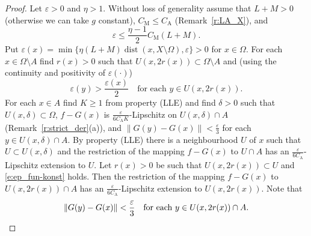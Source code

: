 \documentclass[a4paper,twoside,10pt,reqno,draft]{amsart}
\newenvironment{emshade}{%
  \snugshade
  \normalsize
}{%
  \endsnugshade
}
\theoremstyle{definition}
\theoremstyle{remark}
\newcommand\norm[1]{\mathopen\|#1\mathclose\|}
\newcommand\de{\delta}
\newcommand\ve{\varepsilon}
\newcommand\Om{\Omega}
\DeclareMathOperator{\dist}{dist}
\newcommand\pLLE{(LLE)}
\newcommand\cCA{C_{\mathrm A}}
\newcommand\cCM{C_{\mathrm M}}
\begin{document}
\begin{proof}\small
Let $\ve>0$ and
\begin{emshade}\noindent
$\eta>1$.
Without loss of generality assume that $L+M>0$ (otherwise we can take $g$ constant), $\cCM\le\cCA$ (Remark~\ref{r:LA_X}), and
\begin{equation}\label{e:ep_eta}
\ve\le\frac{\eta-1}2\cCM(L+M).
\end{equation}
Put $\ve(x)=\min\{\eta(L+M)\dist(x,X\setminus\Om),\ve\}>0$ for $x\in\Om$.
\end{emshade}\noindent
For each $x\in\Om\setminus A$ find $r(x)>0$ such that $U(x,2r(x))\subset\Om\setminus A$
\begin{emshade}\noindent
and (using the continuity and positivity of $\ve(\cdot)$)
\begin{equation}\label{e:ep_fun-konst}
\ve(y)>\frac{\ve(x)}2\quad\text{for each $y\in U(x,2r(x))$.}
\end{equation}
\end{emshade}\noindent
For each $x\in A$ find $K\ge1$ from property {\pLLE}
and find $\de>0$ such that $U(x,\de)\subset\Om$, $f-G(x)$ is $\frac\ve{6\cCA K}$-Lipschitz on $U(x,\de)\cap A$ (Remark~\ref{r:strict_der}(a)), and $\norm{G(y)-G(x)}<\frac\ve3$ for each $y\in U(x,\de)\cap A$.
By property {\pLLE} there is a neighbourhood $U$ of $x$ such that $U\subset U(x,\de)$ and the restriction of the mapping $f-G(x)$ to $U\cap A$ has an $\frac\ve{6\cCA}$-Lipschitz extension to $U$.
Let $r(x)>0$ be such that $U(x,2r(x))\subset U$
\begin{emshade}\noindent
and \eqref{e:ep_fun-konst} holds.
\end{emshade}\noindent
Then the restriction of the mapping $f-G(x)$ to $U(x,2r(x))\cap A$ has an $\frac\ve{6\cCA}$-Lipschitz extension to $U(x,2r(x))$.
Note that
\begin{equation}\label{e:Gest_2}
\norm{G(y)-G(x)}<\frac\ve3\text{\quad for each $y\in U(x,2r(x))\cap A$.}
\end{equation}


\end{proof}
\end{document}
